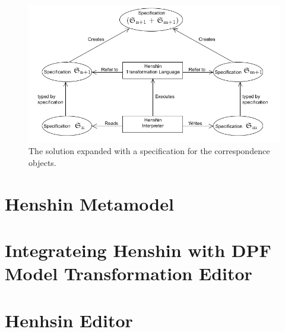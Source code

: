 \begin{figure}[H]
	\centering
	\includegraphics[scale=0.7]{./Figures/TransformationSolution_Correspond.png}
	\caption[Specification for the correspondence objects]
	{The solution expanded with a specification for the correspondence objects.}
	\label{fig:Solution:CorrespondanceObjects}
\end{figure}



\section{Henshin Metamodel}

\section{Integrateing Henshin with DPF Model Transformation Editor}

\section{Henhsin Editor}



